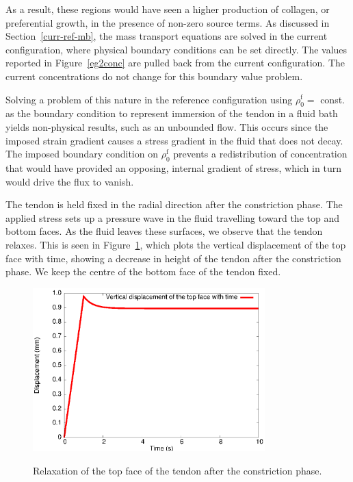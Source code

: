 As a result, these regions would have seen a higher production of
collagen, or preferential growth, in the presence of non-zero source
terms. As discussed in Section~\ref{curr-ref-mb}, the mass transport
equations are solved in the current configuration, where physical
boundary conditions can be set directly. The values reported in
Figure~\ref{eg2conc} are pulled back from the current
configuration. The current concentrations do not change for this
boundary value problem. 

Solving a problem of this nature in the
reference configuration using $\rho_0^\mathrm{f} = $ const. as the
boundary condition to represent immersion of the tendon in a fluid bath
yields non-physical results, such as an unbounded flow. This occurs
since the imposed strain gradient causes a stress gradient in the
fluid that does not decay. The imposed boundary condition on $\rho_0^\mathrm{f}$
prevents a redistribution of concentration that would have provided an
opposing, internal gradient of stress, which in turn would drive the
flux to vanish.

The tendon is held fixed in the radial direction after the
constriction phase. The applied stress sets up a pressure wave in the
fluid travelling toward the top and bottom faces. As the fluid leaves
these surfaces, we observe that the tendon relaxes. This is seen in
Figure~\ref{topdisp}, which plots the vertical displacement of the top
face with time, showing a decrease in height of the tendon after the
constriction phase. We keep the centre of the bottom face of the
tendon fixed.

\begin{figure}[!hpt]
  \centering
      {\includegraphics[width=0.8\textwidth]{images/examples/lagrangian/constriction/top-vertical-displacement}}
      \caption{Relaxation of the top face of the tendon after the
      constriction phase.}
      \label{topdisp}
\end{figure}


